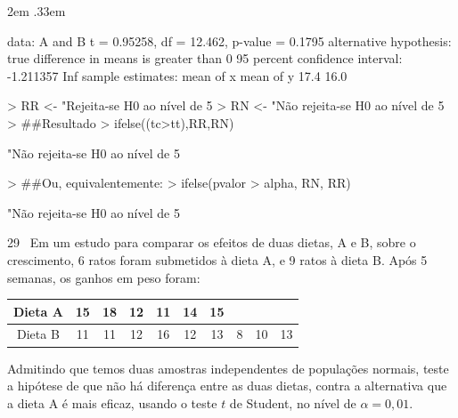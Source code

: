 \documentclass{article}
\newenvironment{ManualExercise}
  {\begin{list}{}{\leftmargin \QuestionIndent
    \partopsep0pt \parsep\parskip \topsep\QuestionBefore
    \itemsep\QuestionBefore \labelwidth2em
    \labelsep.33em
    \usecounter{Question}}}
  {\end{list}}
\begin{document}
\begin{Exercise}
\begin{ManualExercise}
\begin{Schunk}
\begin{Soutput}
data:  A and B
t = 0.95258, df = 12.462, p-value = 0.1795
alternative hypothesis: true difference in means is greater than 0
95 percent confidence interval:
 -1.211357       Inf
sample estimates:
mean of x mean of y 
     17.4      16.0 
\end{Soutput}
\begin{Sinput}
> RR <- "Rejeita-se H0 ao nível de 5%
> RN <- "Não rejeita-se H0 ao nível de 5%
> ##Resultado
> ifelse((tc>tt),RR,RN)
\end{Sinput}
\begin{Soutput}
[1] "Não rejeita-se H0 ao nível de 5%
\end{Soutput}
\begin{Sinput}
> ##Ou, equivalentemente:
> ifelse(pvalor > alpha, RN, RR)
\end{Sinput}
\begin{Soutput}
[1] "Não rejeita-se H0 ao nível de 5%
\end{Soutput}
\end{Schunk}

\item[29~] Em um estudo para comparar os efeitos de duas dietas, A e B, sobre o crescimento, 6 ratos foram submetidos à dieta A, e 9 ratos à dieta B. Após 5 semanas, os ganhos em peso foram:

\begin{tabular}{c|c|c|c|c|c|c|c|c|c} \hline
Dieta A & 15 & 18 & 12 & 11 & 14 & 15 &  & &  \\ \hline
Dieta B & 11 & 11 & 12 & 16 & 12 & 13 & 8 & 10 & 13  \\ \hline
\end{tabular}
\begin{tasks}
\task Admitindo que temos duas amostras independentes de populações normais, teste a hipótese de que não há diferença entre as duas dietas, contra a alternativa que a 
dieta A é mais eficaz, usando o teste $t$ de Student, no nível de $\alpha = 0,01$.
\end{tasks}


\end{ManualExercise}
\end{Exercise}
\end{document}
